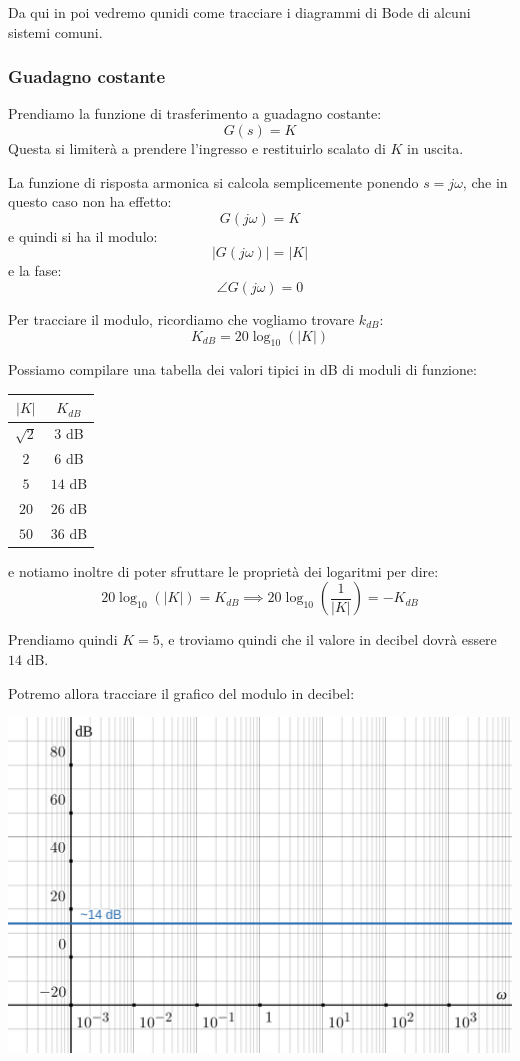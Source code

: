 \documentclass[a4paper,11pt]{article}
\begin{document}
Da qui in poi vedremo qunidi come tracciare i diagrammi di Bode di alcuni sistemi comuni.

\subsubsection{Guadagno costante}
Prendiamo la funzione di trasferimento a guadagno costante:
$$
G(s) = K
$$
Questa si limiterà a prendere l'ingresso e restituirlo scalato di $K$ in uscita.

La funzione di risposta armonica si calcola semplicemente ponendo $s = j \omega$, che in questo caso non ha effetto:
$$
G(j \omega) = K 
$$
e quindi si ha il modulo:
$$
|G(j \omega)| = |K|
$$
e la fase:
$$
\angle G(j \omega) = 0 
$$

Per tracciare il modulo, ricordiamo che vogliamo trovare $k_{dB}$:
$$
K_{dB} = 20 \log_{10}(|K|) 
$$

Possiamo compilare una tabella dei valori tipici in dB di moduli di funzione:
\begin{table}[H]
	\center {}
	\begin{tabular} { c | c }
		$|K|$ & $K_{dB}$ \\ 
		\hline
		$\sqrt{2}$ & $3$ dB \\
		$2$ & $6$ dB \\
		$5$ & $14$ dB \\
		$20$ & $26$ dB \\
		$50$ & $36$ dB 
	\end{tabular}
\end{table}
e notiamo inoltre di poter sfruttare le proprietà dei logaritmi per dire:
$$
20 \log_{10}(|K|) = K_{dB} \implies 20 \log_{10}\left(\frac{1}{|K|}\right) = - K_{dB}
$$

Prendiamo quindi $K = 5$, e troviamo quindi che il valore in decibel dovrà essere $14$ dB.

\par\medskip

\noindent
\begin{minipage}{\textwidth}
Potremo allora tracciare il grafico del modulo in decibel:
\begin{center}
	\includegraphics[scale=0.3]{../figures/costant_bode/mod.png}
\end{center}
\end{minipage}
\end{document}
